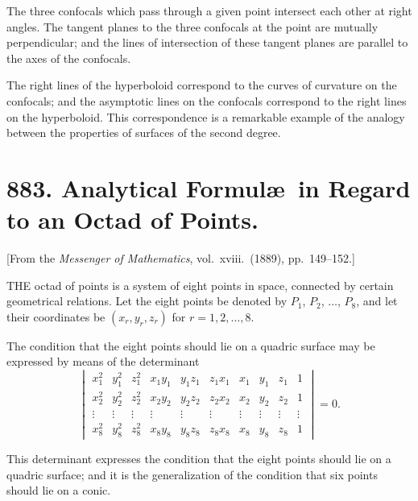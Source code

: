 \documentclass[11pt,a4paper]{book}
\begin{document}
\medskip\noindent
The three confocals which pass through a given point intersect each other at right angles. The tangent planes to the three confocals at the point are mutually perpendicular; and the lines of intersection of these tangent planes are parallel to the axes of the confocals.

\medskip\noindent
The right lines of the hyperboloid correspond to the curves of curvature on the confocals; and the asymptotic lines on the confocals correspond to the right lines on the hyperboloid. This correspondence is a remarkable example of the analogy between the properties of surfaces of the second degree.

\newpage
\section[883]{883. Analytical Formul\ae\ in Regard to an Octad of Points.}
\label{sec:883}

[From the \textit{Messenger of Mathematics}, vol.\ xviii.\ (1889), pp.\ 149--152.]

\medskip\noindent
THE octad of points is a system of eight points in space, connected by certain geometrical relations. Let the eight points be denoted by $P_{1}$, $P_{2}$, $\ldots$, $P_{8}$, and let their coordinates be $(x_{r}, y_{r}, z_{r})$ for $r = 1, 2, \ldots, 8$.

\medskip\noindent
The condition that the eight points should lie on a quadric surface may be expressed by means of the determinant
\[
\begin{vmatrix}
x_{1}^{2} & y_{1}^{2} & z_{1}^{2} & x_{1}y_{1} & y_{1}z_{1} & z_{1}x_{1} & x_{1} & y_{1} & z_{1} & 1 \\
x_{2}^{2} & y_{2}^{2} & z_{2}^{2} & x_{2}y_{2} & y_{2}z_{2} & z_{2}x_{2} & x_{2} & y_{2} & z_{2} & 1 \\
\vdots & \vdots & \vdots & \vdots & \vdots & \vdots & \vdots & \vdots & \vdots & \vdots \\
x_{8}^{2} & y_{8}^{2} & z_{8}^{2} & x_{8}y_{8} & y_{8}z_{8} & z_{8}x_{8} & x_{8} & y_{8} & z_{8} & 1
\end{vmatrix} = 0.
\]

\medskip\noindent
This determinant expresses the condition that the eight points should lie on a quadric surface; and it is the generalization of the condition that six points should lie on a conic.
\end{document}

